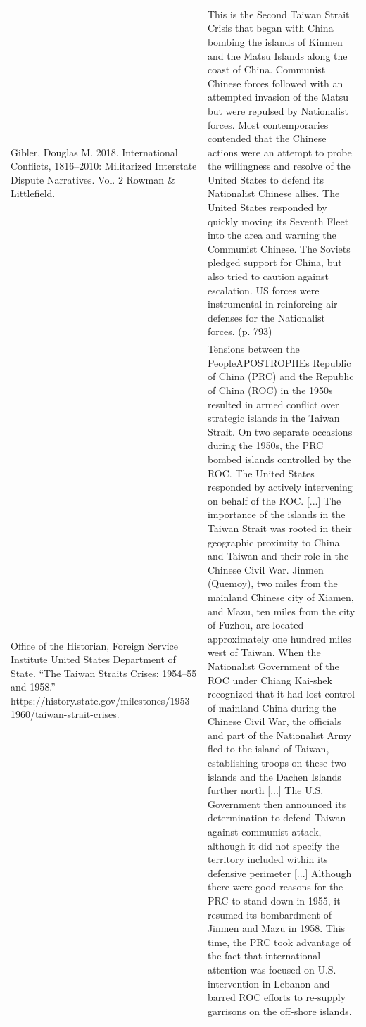 {\begin{longtable}{p{}p{}}
Gibler, Douglas M. 2018. International Conflicts, 1816–2010: Militarized Interstate Dispute Narratives. Vol. 2 Rowman \& Littlefield. & This is the Second Taiwan Strait Crisis that began with China bombing the islands of Kinmen and the Matsu Islands along the coast of China. Communist Chinese forces followed with an attempted invasion of the Matsu but were repulsed by Nationalist forces. Most contemporaries contended that the Chinese actions were an attempt to probe the willingness and resolve of the United States to defend its Nationalist Chinese allies. The United States responded by quickly moving its Seventh Fleet into the area and warning the Communist Chinese. The Soviets pledged support for China, but also tried to caution against escalation. US forces were instrumental in reinforcing air defenses for the Nationalist forces. (p. 793)
\\
Office of the Historian, Foreign Service Institute United States Department of State. “The Taiwan Straits Crises: 1954–55 and 1958.” https://history.state.gov/milestones/1953-1960/taiwan-strait-crises. & Tensions between the PeopleAPOSTROPHEs Republic of China (PRC) and the Republic of China (ROC) in the 1950s resulted in armed conflict over strategic islands in the Taiwan Strait. On two separate occasions during the 1950s, the PRC bombed islands controlled by the ROC. The United States responded by actively intervening on behalf of the ROC. [...] The importance of the islands in the Taiwan Strait was rooted in their geographic proximity to China and Taiwan and their role in the Chinese Civil War. Jinmen (Quemoy), two miles from the mainland Chinese city of Xiamen, and Mazu, ten miles from the city of Fuzhou, are located approximately one hundred miles west of Taiwan. When the Nationalist Government of the ROC under Chiang Kai-shek recognized that it had lost control of mainland China during the Chinese Civil War, the officials and part of the Nationalist Army fled to the island of Taiwan, establishing troops on these two islands and the Dachen Islands further north [...]  The U.S. Government then announced its determination to defend Taiwan against communist attack, although it did not specify the territory included within its defensive perimeter [...] Although there were good reasons for the PRC to stand down in 1955, it resumed its bombardment of Jinmen and Mazu in 1958. This time, the PRC took advantage of the fact that international attention was focused on U.S. intervention in Lebanon and barred ROC efforts to re-supply garrisons on the off-shore islands.
\\

\end{longtable}}

